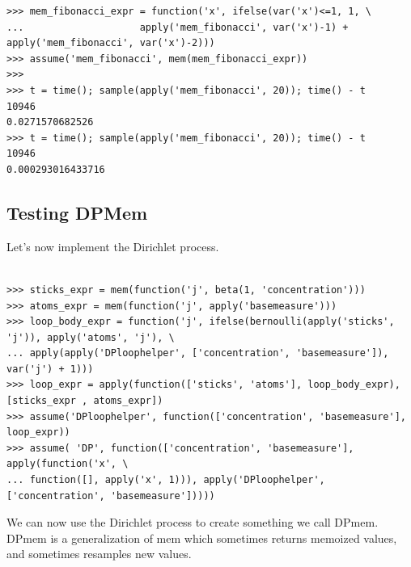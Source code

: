 \documentclass[11pt]{article}
\begin{document}
\begin{small}
\begin{verbatim}
>>> mem_fibonacci_expr = function('x', ifelse(var('x')<=1, 1, \
...                    apply('mem_fibonacci', var('x')-1) + apply('mem_fibonacci', var('x')-2)))
>>> assume('mem_fibonacci', mem(mem_fibonacci_expr))
>>>
>>> t = time(); sample(apply('mem_fibonacci', 20)); time() - t
10946
0.0271570682526
>>> t = time(); sample(apply('mem_fibonacci', 20)); time() - t
10946
0.000293016433716
\end{verbatim}
\end{small}

\subsection{Testing DPMem}

Let's now implement the Dirichlet process.  

\begin{small}
\begin{verbatim}

>>> sticks_expr = mem(function('j', beta(1, 'concentration')))
>>> atoms_expr = mem(function('j', apply('basemeasure')))
>>> loop_body_expr = function('j', ifelse(bernoulli(apply('sticks', 'j')), apply('atoms', 'j'), \
... apply(apply('DPloophelper', ['concentration', 'basemeasure']), var('j') + 1))) 
>>> loop_expr = apply(function(['sticks', 'atoms'], loop_body_expr), [sticks_expr , atoms_expr])
>>> assume('DPloophelper', function(['concentration', 'basemeasure'], loop_expr))
>>> assume( 'DP', function(['concentration', 'basemeasure'], apply(function('x', \
... function([], apply('x', 1))), apply('DPloophelper', ['concentration', 'basemeasure']))))
\end{verbatim}
\end{small}

We can now use the Dirichlet process to create something we call DPmem.  DPmem is a generalization of mem which sometimes returns memoized values, and sometimes resamples new values.  
\end{document}
